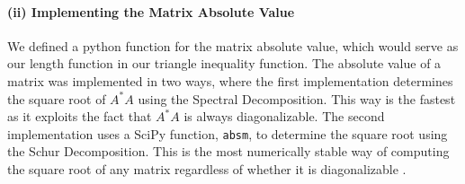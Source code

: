 \paragraph{\textbf{(ii) Implementing the Matrix Absolute Value}} We defined a python function for the matrix absolute value, which would serve as our length function in our triangle inequality function. The absolute value of a matrix was implemented in two ways, where the first implementation determines the square root of $A^*A$ using the Spectral Decomposition. This way is the fastest as it exploits the fact that $A^*A$ is always diagonalizable. The second implementation uses a SciPy function, \texttt{absm}, to determine the square root using the Schur Decomposition. This is the most numerically stable way of computing the square root of any matrix regardless of whether it is diagonalizable \cite{Edvin}.

\begin{algorithm}
    \caption{Compute Matrix Absolute Value (Spectral), \texttt{matrix\_absolute\_value()}}
    \begin{algorithmic}[1]
    \end{algorithmic}
\end{algorithm}

